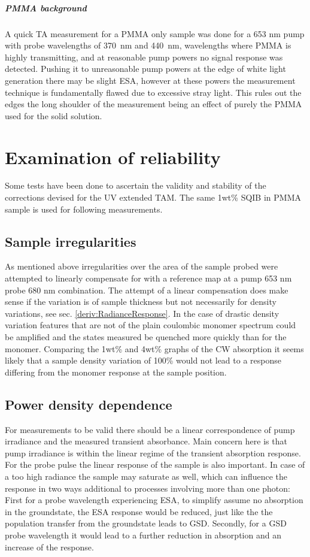 \documentclass[twoside,openright]{scrreprt}
\begin{document}
{\paragraph{PMMA background}
A quick TA measurement for a PMMA only sample was done for a 653 nm pump with probe wavelengths of \SI{370}{\nano\meter} and \SI{440}{\nano\meter},  wavelengths where PMMA is highly transmitting, and at reasonable pump powers no signal response was detected. Pushing it to unreasonable pump powers at the edge of white light generation there may be slight ESA, however at these powers the measurement technique is fundamentally flawed due to excessive stray light. This rules out the edges the long shoulder of the measurement being an effect of purely the PMMA used for the solid solution.




\chapter{Examination of reliability}\label{chpt:reliability}
Some tests have been done to ascertain the validity and stability of the corrections devised for the UV extended TAM. The same 1wt\% SQIB in PMMA sample is used for following measurements.
\section{Sample irregularities}
As mentioned above irregularities over the area of the sample probed were attempted to linearly compensate for with a reference map at a pump 653 nm probe 680 nm combination. The attempt of a linear compensation does make sense if the variation is of sample thickness but not necessarily for density variations, see sec. \ref{deriv:RadianceResponse}. In the case of drastic density variation features that are not of the plain coulombic monomer spectrum could be amplified and the states measured be quenched more quickly than for the monomer. Comparing the 1wt\% and 4wt\% graphs of the CW absorption it seems likely that a sample density variation of 100\% would not lead to a response differing from the monomer response at the sample position.

\section{Power density dependence}\label{sec:powerVar}
For measurements to be valid there should be a linear correspondence of pump irradiance and the measured transient absorbance. Main concern here is that pump irradiance is within the linear regime of the transient absorption response. For the probe pulse the linear response of the sample is also important. In case of a too high radiance the sample may saturate as well, which can influence the response in two ways additional to processes involving more than one photon: First for a probe wavelength experiencing ESA, to simplify assume no absorption in the groundstate, the ESA response would be reduced, just like the the population transfer from the groundstate leads to GSD. Secondly, for a GSD probe wavelength it would lead to a further reduction in absorption  and an increase of the response.\\

}
\end{document}

